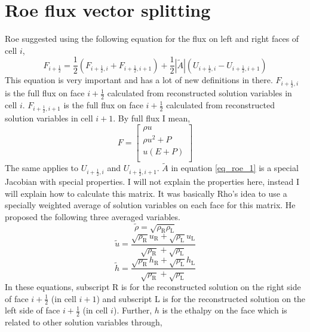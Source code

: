\documentclass{article}
\begin{document}
\section{Roe flux vector splitting}
Roe suggested using the following equation for the flux on left and right faces of cell $i$,
\begin{equation}
\label{eq_roe_1}
F_{i+\frac{1}{2}} = \dfrac{1}{2}\left(F_{i+\frac{1}{2},i} +F_{i+\frac{1}{2},i+1} \right) + \dfrac{1}{2} |\tilde{A}| \left( U_{i+\frac{1}{2},i}-U_{i+\frac{1}{2},i+1} \right)
\end{equation}
This equation is very important and has a lot of new definitions in there. $F_{i+\frac{1}{2},i}$ is the full flux on face $i+\frac{1}{2}$ calculated from reconstructed solution variables in cell $i$. $F_{i+\frac{1}{2},i+1}$ is the full flux on face $i+\frac{1}{2}$ calculated from reconstructed solution variables in cell $i+1$. By full flux I mean,
\begin{equation*}
F = \left[
\begin{matrix}
\rho u \\[10pt]
\rho u^2+ P\\[10pt]
u(E+P) \\
\end{matrix}
\right]
\end{equation*}
The same applies to $U_{i+\frac{1}{2},i}$ and $U_{i+\frac{1}{2},i+1}$. $\tilde{A}$ in  equation \ref{eq_roe_1} is a special Jacobian with special properties. I will not explain the properties here, instead I will explain how to calculate this matrix. It was basically Rho's idea to use a specially weighted average of solution variables on each face for this matrix. He proposed the following three averaged variables.
\begin{equation*}
\tilde{\rho}=\sqrt{\rho_\text{R}\rho_\text{L}}
\end{equation*}
\begin{equation*}
\tilde{u}=\dfrac{\sqrt{\rho_\text{R}} u_\text{R}+\sqrt{\rho_\text{L}} u_\text{L}   }{  \sqrt{\rho_\text{R}}+\sqrt{\rho_\text{L}}}
\end{equation*}
\begin{equation*}
\tilde{h}=\dfrac{\sqrt{\rho_\text{R}} h_\text{R}+\sqrt{\rho_\text{L}} h_\text{L}   }{  \sqrt{\rho_\text{R}}+\sqrt{\rho_\text{L}}}
\end{equation*}
In these equations, subscript R is for the reconstructed solution on the right side of face $i+\frac{1}{2}$ (in cell $i+1$) and subscript L is for the reconstructed solution on the left side of face $i+\frac{1}{2}$ (in cell $i$). Further, $h$ is the ethalpy on the face which is related to other solution variables through,
\end{document}
